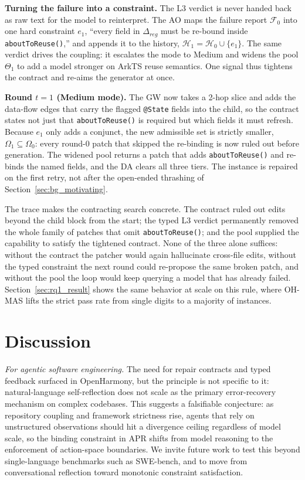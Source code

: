 \documentclass[10pt,conference]{IEEEtran}
\begin{document}
\textbf{Turning the failure into a constraint.} The L3 verdict is never handed back as raw text for the model to reinterpret. The AO maps the failure report $\mathcal{F}_0$ into one hard constraint $e_1$, ``every field in $\Delta_{reg}$ must be re-bound inside \texttt{aboutToReuse()},'' and appends it to the history, $\mathcal{H}_1=\mathcal{H}_0\cup\{e_1\}$. The same verdict drives the coupling: it escalates the mode to Medium and widens the pool $\Theta_1$ to add a model stronger on ArkTS reuse semantics. One signal thus tightens the contract and re-aims the generator at once.

\textbf{Round $t{=}1$ (Medium mode).} The GW now takes a 2-hop slice and adds the data-flow edges that carry the flagged \texttt{@State} fields into the child, so the contract states not just that \texttt{aboutToReuse()} is required but which fields it must refresh. Because $e_1$ only adds a conjunct, the new admissible set is strictly smaller, $\Omega_1\subseteq\Omega_0$: every round-0 patch that skipped the re-binding is now ruled out before generation. The widened pool returns a patch that adds \texttt{aboutToReuse()} and re-binds the named fields, and the DA clears all three tiers. The instance is repaired on the first retry, not after the open-ended thrashing of Section~\ref{sec:bg_motivating}.

The trace makes the contracting search concrete. The contract ruled out edits beyond the child block from the start; the typed L3 verdict permanently removed the whole family of patches that omit \texttt{aboutToReuse()}; and the pool supplied the capability to satisfy the tightened contract. None of the three alone suffices: without the contract the patcher would again hallucinate cross-file edits, without the typed constraint the next round could re-propose the same broken patch, and without the pool the loop would keep querying a model that has already failed. Section~\ref{sec:rq1_result} shows the same behavior at scale on this rule, where OH-MAS lifts the strict pass rate from single digits to a majority of instances.

\section{Discussion}
\label{sec:discussion}

\textit{For agentic software engineering.} The need for repair contracts and typed feedback surfaced in OpenHarmony, but the principle is not specific to it: natural-language self-reflection does not scale as the primary error-recovery mechanism on complex codebases. This suggests a falsifiable conjecture: as repository coupling and framework strictness rise, agents that rely on unstructured observations should hit a divergence ceiling regardless of model scale, so the binding constraint in APR shifts from model reasoning to the enforcement of action-space boundaries. We invite future work to test this beyond single-language benchmarks such as SWE-bench, and to move from conversational reflection toward monotonic constraint satisfaction.
\end{document}
